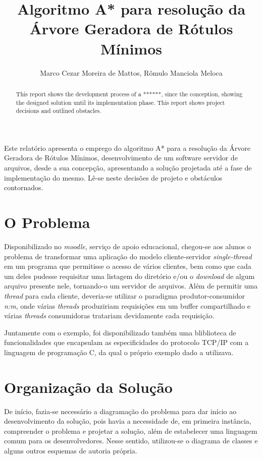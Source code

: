 \documentclass[12pt]{article}
\title{Algoritmo A* para resolução da Árvore Geradora de Rótulos Mínimos}
\author{Marco Cezar Moreira de Mattos\inst{1}, Rômulo Manciola Meloca\inst{1}}
\begin{document}
\maketitle

\begin{abstract}
  This report shows the development process of a ******, since the conception, showing the designed solution until its implementation phase. This report shows project decisions and outlined obstacles.
\end{abstract}
     
\begin{resumo} 
  Este relatório apresenta o emprego do algoritmo A* para a resolução da Árvore Geradora de Rótulos Mínimos, desenvolvimento de um software servidor de arquivos, desde a sua concepção, apresentando a solução projetada até a fase de implementação do mesmo. Lê-se neste decisões de projeto e obstáculos contornados.
\end{resumo}

\section{O Problema}\label{sec:problema}

Disponibilizado no \textit{moodle}, serviço de apoio educacional, chegou-se aos alunos o problema de transformar uma aplicação do modelo cliente-servidor \textit{single-thread} em um programa que permitisse o acesso de vários clientes, bem como que cada um deles pudesse requisitar uma listagem do diretório e/ou o \textit{download} de algum arquivo presente nele, tornando-o um servidor de arquivos. Além de permitir uma \textit{thread} para cada cliente, deveria-se utilizar o paradigma produtor-consumidor \emph{n:m}, onde várias \textit{threads} produziriam requisições em um buffer compartilhado e várias \textit{threads} consumidoras tratariam devidamente cada requisição.

Juntamente com o exemplo, foi disponibilizado também uma bliblioteca de funcionalidades que encapsulam as especificidades do protocolo TCP/IP com a linguagem de programação C, da qual o próprio exemplo dado a utilizava.

\section{Organização da Solução}\label{sec:solucao}

De início, fazia-se necessário a diagramação do problema para dar início ao desenvolvimento da solução, pois havia a necessidade de, em primeira instância, compreender o problema e projetar a solução, além de estabelecer uma linguagem comum para os desenvolvedores. Nesse sentido, utilizou-se o diagrama de classes e alguns outros esquemas de autoria própria.
\end{document}
